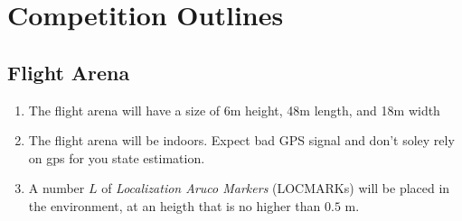 \section{Competition Outlines}

\subsection{Flight Arena}
\begin{enumerate}
	\item{The flight arena will have a size of 6m height, 48m length, and 18m width}
	\item{The flight arena will be indoors. Expect bad GPS signal and don't soley rely on gps for you state estimation.}
        \item{A number $L$ of \emph{Localization Aruco Markers} (LOCMARKs) will be placed in the environment, at an heigth that is no higher than $0.5$ m.}
\end{enumerate}

